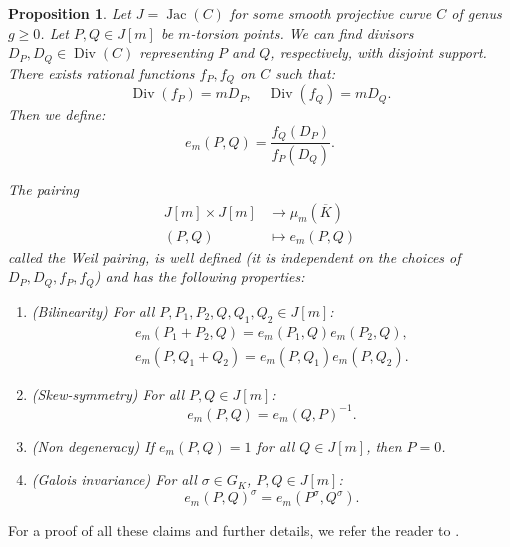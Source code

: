 \documentclass[a4paper, 12pt]{amsart}
\theoremstyle{definition}
\theoremstyle{plain}
\newtheorem{prop0}[defn0]{Proposition}
\theoremstyle{plain}
\theoremstyle{plain}
\theoremstyle{plain}
\theoremstyle{remark}
\theoremstyle{remark}
\theoremstyle{plain}
\newenvironment{proposition}{ \begin{prop0}}{\end{prop0}}
\DeclareMathOperator{\Div}{Div}
\DeclareMathOperator{\Jac}{Jac}
\begin{document}
	\begin{proposition}\label{Weilpairing}
		Let $J=\Jac(C)$ for some smooth projective curve $C$ of genus $g\ge 0$. Let $P,Q\in J[m]$ be $m$-torsion points. We can find divisors $D_P,D_Q\in\Div(C)$ representing $P$ and $Q$, respectively, with disjoint support. There exists rational functions $f_P,f_Q$ on $C$ such that:
		\begin{equation*}
			\Div(f_P)=mD_P,\quad \Div(f_Q)=mD_Q.
		\end{equation*}
		Then we define:
		\begin{equation*}
			e_m(P,Q)=\frac{f_Q(D_P)}{f_P(D_Q)}.
		\end{equation*}
				
		The pairing
		\begin{align*}
			J[m]\times J[m]&\rightarrow \mu_m(\overline{K})\\
			(P,Q)&\mapsto e_m(P,Q)
		\end{align*}
		called the Weil pairing, is well defined (it is independent on the choices of $D_P,D_Q,f_P,f_Q$) and has the following properties:
		\begin{enumerate}
			\item (Bilinearity) For all $P,P_1,P_2,Q,Q_1,Q_2\in J[m]$:
			\begin{gather*}
				e_m(P_1+P_2,Q)=e_m(P_1,Q)e_m(P_2,Q),\\
				e_m(P,Q_1+Q_2)=e_m(P,Q_1)e_m(P,Q_2).
			\end{gather*}
			\item (Skew-symmetry) For all $P,Q\in J[m]$:
			\begin{equation*}
				e_m(P,Q)=e_m(Q,P)^{-1}.
			\end{equation*}
			\item (Non degeneracy) If $e_m(P,Q)=1$ for all $Q\in J[m]$, then $P=0$.
			\item (Galois invariance) For all $\sigma\in G_K$, $P,Q\in J[m]$:
			\begin{equation*}
				e_m(P,Q)^\sigma=e_m(P^\sigma,Q^\sigma).
			\end{equation*}
		\end{enumerate}
	\end{proposition}
		
	For a proof of all these claims and further details, we refer the reader to \cite{Hindry_Silverman_2000}.
	
\end{document}
